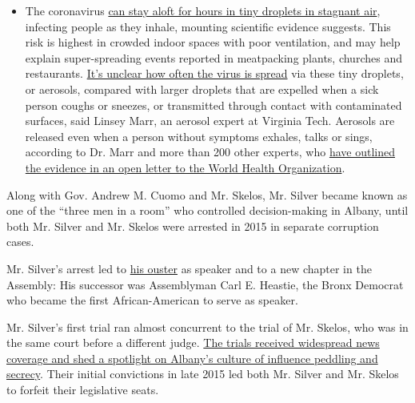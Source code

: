 \begin{itemize}
  \begin{itemize}
  \tightlist
  \item
    The coronavirus
    \href{https://www.nytimes.com/2020/07/04/health/239-experts-with-one-big-claim-the-coronavirus-is-airborne.html?action=click\&pgtype=Article\&state=default\&region=MAIN_CONTENT_3\&context=storylines_faq}{can
    stay aloft for hours in tiny droplets in stagnant air}, infecting
    people as they inhale, mounting scientific evidence suggests. This
    risk is highest in crowded indoor spaces with poor ventilation, and
    may help explain super-spreading events reported in meatpacking
    plants, churches and restaurants.
    \href{https://www.nytimes.com/2020/07/06/health/coronavirus-airborne-aerosols.html?action=click\&pgtype=Article\&state=default\&region=MAIN_CONTENT_3\&context=storylines_faq}{It's
    unclear how often the virus is spread} via these tiny droplets, or
    aerosols, compared with larger droplets that are expelled when a
    sick person coughs or sneezes, or transmitted through contact with
    contaminated surfaces, said Linsey Marr, an aerosol expert at
    Virginia Tech. Aerosols are released even when a person without
    symptoms exhales, talks or sings, according to Dr. Marr and more
    than 200 other experts, who
    \href{https://academic.oup.com/cid/article/doi/10.1093/cid/ciaa939/5867798}{have
    outlined the evidence in an open letter to the World Health
    Organization}.
  \end{itemize}
\end{itemize}

Along with Gov. Andrew M. Cuomo and Mr. Skelos, Mr. Silver became known
as one of the ``three men in a room'' who controlled decision-making in
Albany, until both Mr. Silver and Mr. Skelos were arrested in 2015 in
separate corruption cases.

Mr. Silver's arrest led to
\href{https://www.nytimes.com/2015/01/29/nyregion/6-days-that-felled-sheldon-silver-the-speaker-who-ruled-albany-for-decades.html}{his
ouster} as speaker and to a new chapter in the Assembly: His successor
was Assemblyman Carl E. Heastie, the Bronx Democrat who became the first
African-American to serve as speaker.

Mr. Silver's first trial ran almost concurrent to the trial of Mr.
Skelos, who was in the same court before a different judge.
\href{https://www.nytimes.com/2015/11/02/nyregion/in-two-corruption-cases-the-culture-of-albany-will-go-on-trial.html?searchResultPosition=15}{The
trials received widespread news coverage and shed a spotlight on
Albany's culture of influence peddling and secrecy}. Their initial
convictions in late 2015 led both Mr. Silver and Mr. Skelos to forfeit
their legislative seats.

